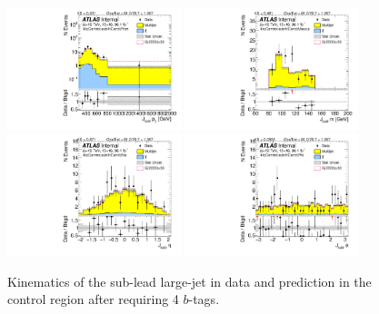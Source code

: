\begin{figure}[htbp!]
\begin{center}
\includegraphics[width=0.45\textwidth,angle=-90]{figures/boosted/Control/b77_FourTag_Control_sublHCand_Pt_m_1.pdf}
\includegraphics[width=0.45\textwidth,angle=-90]{figures/boosted/Control/b77_FourTag_Control_sublHCand_Mass_s.pdf}\\
\includegraphics[width=0.45\textwidth,angle=-90]{figures/boosted/Control/b77_FourTag_Control_sublHCand_Eta.pdf}
\includegraphics[width=0.45\textwidth,angle=-90]{figures/boosted/Control/b77_FourTag_Control_sublHCand_Phi.pdf}
  \caption{Kinematics of the sub-lead large-\R jet in data and prediction in the control region after requiring 4 $b$-tags. }
  \label{fig:boosted-4b-control-ak10-subl}
\end{center}
\end{figure}

